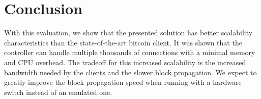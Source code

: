 \section{Conclusion}
With this evaluation, we show that the presented solution has better scalability characteristics than the state-of-the-art bitcoin client. It was shown that the controller can handle multiple thousands of connections with a minimal memory and CPU overhead. The tradeoff for this increased scalability is the increased bandwidth needed by the clients and the slower block propagation. We expect to greatly improve the block propagation speed when running with a hardware switch instead of an emulated one.




















